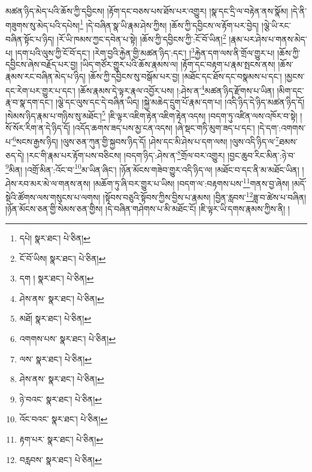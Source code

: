 མཚན་ཉིད་མེད་པའི་ཆོས་ཀྱི་དབྱིངས། །རྟོག་དང་བཅས་པས་ཐོས་པར་འགྱུར། །སྣ་དང་དྲི་ལ་བརྟེན་ནས་སྣོམ། །དེ་ནི་གཟུགས་སུ་མེད་པའི་དཔེས།\footnote{དཔེ།  སྣར་ཐང་།  པེ་ཅིན། } །དེ་བཞིན་སྣ་ཡི་རྣམ་ཤེས་ཀྱིས། །ཆོས་ཀྱི་དབྱིངས་ལ་རྟོག་པར་བྱེད། །ལྕེ་ཡི་རང་བཞིན་སྟོང་པ་ཉིད། །རོ་ཡི་ཁམས་ཀྱང་དབེན་པ་སྟེ། །ཆོས་ཀྱི་དབྱིངས་ཀྱི་:ངོ་བོ་ཡིན།\footnote{ངོ་བོ་ཡིས།  སྣར་ཐང་།  པེ་ཅིན། } །རྣམ་པར་ཤེས་པ་གནས་མེད་པ། །དག་པའི་ལུས་ཀྱི་ངོ་བོ་དང་། །རེག་བྱའི་རྐྱེན་གྱི་མཚན་ཉིད་:དང་། །\footnote{དག །  སྣར་ཐང་།  པེ་ཅིན། }རྐྱེན་དག་ལས་ནི་གྲོལ་གྱུར་པ། །ཆོས་ཀྱི་དབྱིངས་ཞེས་བརྗོད་པར་བྱ། །ཡིད་གཙོར་གྱུར་པའི་ཆོས་རྣམས་ལ། །རྟོག་དང་བརྟག་པ་རྣམ་སྤངས་ནས། །ཆོས་རྣམས་རང་བཞིན་མེད་པ་ཉིད། །ཆོས་ཀྱི་དབྱིངས་སུ་བསྒོམ་པར་བྱ། །མཐོང་དང་ཐོས་དང་བསྣམས་པ་དང་། །མྱངས་དང་རེག་པར་གྱུར་པ་དང་། །ཆོས་རྣམས་དེ་ལྟར་རྣལ་འབྱོར་པས། །:ཤེས་ན་\footnote{ཤེས་ནས་  སྣར་ཐང་།  པེ་ཅིན། }མཚན་ཉིད་རྫོགས་པ་ཡིན། །མིག་དང་རྣ་བ་སྣ་དག་དང་། །ལྕེ་དང་ལུས་དང་དེ་བཞིན་ཡིད། །སྐྱེ་མཆེད་དྲུག་པོ་རྣམ་དག་པ། །འདི་ཉིད་དེ་ཉིད་མཚན་ཉིད་དོ། །སེམས་ཉིད་རྣམ་པ་གཉིས་སུ་མཐོང་།\footnote{མཐོ།  སྣར་ཐང་།  པེ་ཅིན། } །ཇི་ལྟར་འཇིག་རྟེན་འཇིག་རྟེན་འདས། །བདག་ཏུ་འཛིན་ལས་འཁོར་བ་སྟེ། །སོ་སོར་རིག་ན་དེ་ཉིད་དོ། །འདོད་ཆགས་ཟད་པས་མྱ་ངན་འདས། །ཞེ་སྡང་གཏི་མུག་ཟད་པ་དང་། །དེ་དག་:འགགས་པ་\footnote{འགགས་པས་  སྣར་ཐང་།  པེ་ཅིན། }སངས་རྒྱས་ཉིད། །ལུས་ཅན་ཀུན་གྱི་སྐྱབས་ཉིད་དོ། །ཤེས་དང་མི་ཤེས་པ་དག་ལས། །ལུས་འདི་ཉིད་ལ་\footnote{ལས་  སྣར་ཐང་།  པེ་ཅིན། }ཐམས་ཅད་དེ། །རང་གི་རྣམ་པར་རྟོག་པས་བཅིངས། །བདག་ཉིད་:ཤེས་ན་\footnote{ཤེས་ནས་  སྣར་ཐང་།  པེ་ཅིན། }གྲོལ་བར་འགྱུར། །བྱང་ཆུབ་རིང་མིན་:ཉེ་བ་\footnote{ཉེ་བའང་  སྣར་ཐང་།  པེ་ཅིན། }མིན། །འགྲོ་མིན་:འོང་བ་\footnote{འོང་བའང་  སྣར་ཐང་།  པེ་ཅིན། }མ་ཡིན་ཞིང་། །ཉོན་མོངས་གཟེབ་གྱུར་འདི་ཉིད་ལ། །མཐོང་བ་དང་ནི་མ་མཐོང་ཡིན། །ཤེས་རབ་མར་མེ་ལ་གནས་ནས། །མཆོག་ཏུ་ཞི་བར་གྱུར་པ་ཡིས། །བདག་ལ་:བརྟགས་པས་\footnote{རྟག་པར་  སྣར་ཐང་།  པེ་ཅིན། }གནས་བྱ་ཞེས། །མདོ་སྡེའི་ཚོགས་ལས་གསུངས་པ་ལགས། །སྟོབས་བཅུའི་སྟོབས་ཀྱིས་བྱིས་པ་རྣམས། །བྱིན་རླབས་\footnote{བརླབས་  སྣར་ཐང་།  པེ་ཅིན། }ཟླ་བ་ཚེས་པ་བཞིན། །ཉོན་མོངས་ཅན་གྱི་སེམས་ཅན་གྱིས། །དེ་བཞིན་གཤེགས་པ་མི་མཐོང་ངོ། །ཇི་ལྟར་ཡི་དགས་རྣམས་ཀྱིས་ནི། །
